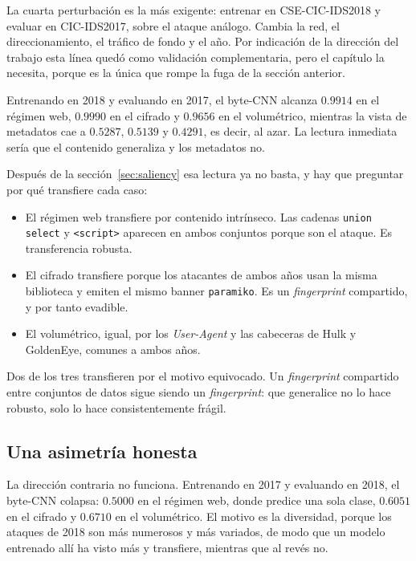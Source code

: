 La cuarta perturbación es la más exigente: entrenar en CSE-CIC-IDS2018 y evaluar
en CIC-IDS2017, sobre el ataque análogo. Cambia la red, el direccionamiento, el
tráfico de fondo y el año. Por indicación de la dirección del trabajo esta línea
quedó como validación complementaria, pero el capítulo la necesita, porque es la
única que rompe la fuga de la sección anterior.

Entrenando en 2018 y evaluando en 2017, el byte-CNN alcanza $0.9914$ en el
régimen web, $0.9990$ en el cifrado y $0.9656$ en el volumétrico, mientras
la vista de metadatos cae a $0.5287$, $0.5139$ y $0.4291$, es decir, al
azar. La lectura inmediata sería que el contenido generaliza y los metadatos no.

Después de la sección~\ref{sec:saliency} esa lectura ya no basta, y hay que
preguntar por qué transfiere cada caso:

\begin{itemize}
  \item El régimen web transfiere por contenido intrínseco. Las cadenas
        \texttt{union select} y \texttt{<script>} aparecen en ambos conjuntos
        porque son el ataque. Es transferencia robusta.
  \item El cifrado transfiere porque los atacantes de ambos años usan la misma
        biblioteca y emiten el mismo banner \texttt{paramiko}. Es un
        \emph{fingerprint} compartido, y por tanto evadible.
  \item El volumétrico, igual, por los \emph{User-Agent} y las cabeceras de Hulk
        y GoldenEye, comunes a ambos años.
\end{itemize}

Dos de los tres transfieren por el motivo equivocado. Un \emph{fingerprint}
compartido entre conjuntos de datos sigue siendo un \emph{fingerprint}: que
generalice no lo hace robusto, solo lo hace consistentemente frágil.

\subsection*{Una asimetría honesta}

La dirección contraria no funciona. Entrenando en 2017 y evaluando en 2018, el
byte-CNN colapsa: $0.5000$ en el régimen web, donde predice una sola clase,
$0.6051$ en el cifrado y $0.6710$ en el volumétrico. El motivo es la
diversidad, porque los ataques de 2018 son más numerosos y más variados, de modo
que un modelo entrenado allí ha visto más y transfiere, mientras que al revés no.

